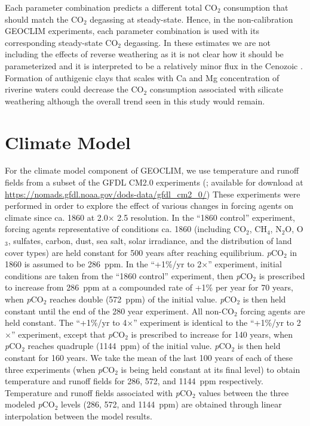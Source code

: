 \documentclass[11pt,letterpaper]{article}
\newcommand{\degrees}{\textdegree\xspace}
\newcommand{\pCOtwo}{\textit{p}CO$_{2}$\xspace}
\newcommand{\COtwo}{CO$_{2}$\xspace}
\begin{document}
Each parameter combination predicts a different total \COtwo consumption that should match the \COtwo degassing at steady-state. Hence, in the non-calibration GEOCLIM experiments, each parameter combination is used with its corresponding steady-state \COtwo degassing. In these estimates we are not including the effects of reverse weathering \citep{Michalopoulos1995a} as it is not clear how it should be parameterized and it is interpreted to be a relatively minor flux in the Cenozoic \citep{Isson2018a}. Formation of authigenic clays that scales with Ca and Mg concentration of riverine waters could decrease the \COtwo consumption associated with silicate weathering although the overall trend seen in this study would remain.

\section*{Climate Model}

For the climate model component of GEOCLIM, we use temperature and runoff fields from a subset of the GFDL CM2.0 experiments (\citealp{Delworth2006a, Delworth2006b}; available for download at \url{https://nomads.gfdl.noaa.gov/dods-data/gfdl_cm2_0/}) These experiments were performed in order to explore the effect of various changes in forcing agents on climate since ca. 1860 at 2.0\degrees $\times$ 2.5\degrees resolution. In the ``1860 control'' experiment, forcing agents representative of conditions ca. 1860 (including \COtwo, CH$_{4}$, N$_{2}$O, O$_{3}$, sulfates, carbon, dust, sea salt, solar irradiance, and the distribution of land cover types) are held constant for 500 years after reaching equilibrium. \pCOtwo in 1860 is assumed to be 286~ppm. In the ``+1\%/yr to 2$\times$'' experiment, initial conditions are taken from the ``1860 control'' experiment, then \pCOtwo is prescribed to increase from 286~ppm at a compounded rate of +1\% per year for 70 years, when \pCOtwo reaches double (572~ppm) of the initial value. \pCOtwo is then held constant until the end of the 280 year experiment. All non-\COtwo forcing agents are held constant. The ``+1\%/yr to 4$\times$'' experiment is identical to the ``+1\%/yr to 2$\times$'' experiment, except that \pCOtwo is prescribed to increase for 140 years, when \pCOtwo reaches quadruple (1144~ppm) of the initial value. \pCOtwo is then held constant for 160 years. We take the mean of the last 100 years of each of these three experiments (when \pCOtwo is being held constant at its final level) to obtain temperature and runoff fields for 286, 572, and 1144~ppm respectively. Temperature and runoff fields associated with \pCOtwo values between the three modeled \pCOtwo levels (286, 572, and 1144~ppm) are obtained through linear interpolation between the model results.
\end{document}
